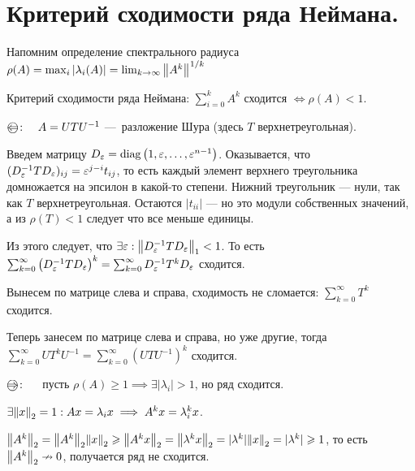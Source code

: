 \section{Критерий сходимости ряда Неймана.}

Напомним определение спектрального радиуса
$\rho(A) = \max_i |\lambda_i(A)| = \lim_{k \to \infty} \norm{A^k}^{1/k}$

Критерий сходимости ряда Неймана: $\sum_{i=0}^k A^k$ сходится $\Longleftrightarrow \rho(A) < 1$.

$\Oleftarrow \colon \quad A = U T U^{-1}$ — разложение Шура (здесь $T$ верхнетреугольная).

Введем матрицу $D_\eps = \diag \left( 1, \eps, \dotsc, \eps^{n-1} \right)$. 
Оказывается, что $(D_\eps^{-1} T D_\eps)_{ij} = \eps^{j-i} t_{ij}$, то есть каждый 
элемент верхнего треугольника домножается на эпсилон в какой-то степени. Нижний треугольник — нули, так как 
$T$ верхнетреугольная. Остаются $|t_{ii}|$ — но это модули собственных значений,
а из $\rho(T) < 1$ следует что все меньше единицы.

Из этого следует, что $\exists \eps: \norm[1]{D^{-1}_\eps T D_\eps} < 1$. То есть 
$\sum_{k=0}^{\infty} \left( D_{\eps}^{-1} T D_{\eps} \right)^k = 
\sum_{k=0}^{\infty} D_{\eps}^{-1} T^k D_{\eps}$ сходится. 

Вынесем по матрице слева и справа, сходимость не сломается: $\sum_{k=0}^{\infty} T^k$ сходится. 

Теперь занесем по матрице слева и справа, но уже другие, тогда
$\sum_{k=0}^{\infty} U T^k U^{-1} = \sum_{k=0}^\infty \left( U T U^{-1} \right)^k$
сходится.

$\Orightarrow \colon \quad$ пусть $\rho(A) \geq 1 \implies \exists |\lambda_i| > 1$, но ряд сходится.

$\exists \norm[2]{x} = 1: Ax = \lambda_i x \implies A^k x = \lambda_i^k x$.

$\norm[2]{A^k} = \norm[2]{A^k} \norm[2]{x} \geq \norm[2]{A^kx} = \norm[2]{\lambda^kx} = |\lambda^k| \norm[2]{x} = 
|\lambda^k| \geq 1$, то есть $\norm[2]{A^k} \nrightarrow 0$, получается ряд не сходится.
